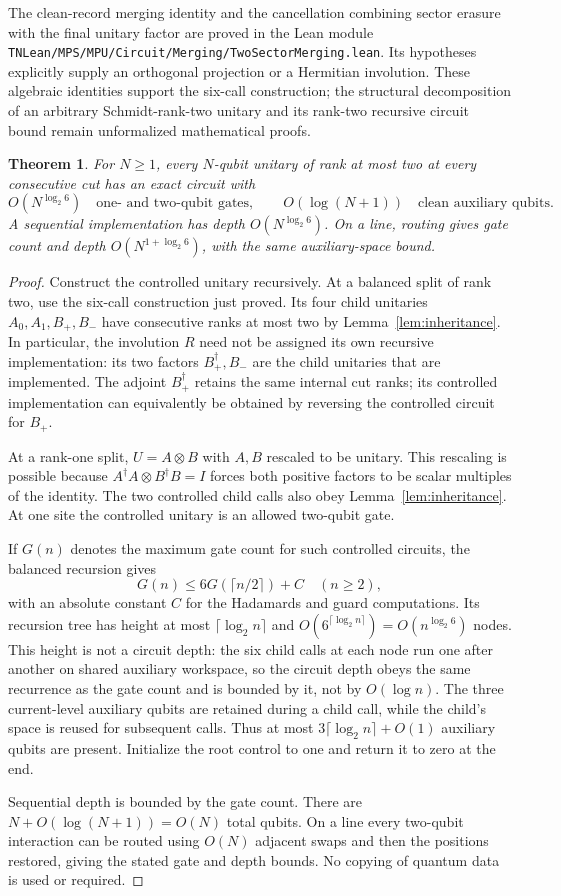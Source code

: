 \documentclass[11pt]{article}
\newtheorem{theorem}[lemma]{Theorem}
\begin{document}
The clean-record merging identity and the cancellation combining sector
erasure with the final unitary factor are proved in the Lean module
\nolinkurl{TNLean/MPS/MPU/Circuit/Merging/TwoSectorMerging.lean}. Its hypotheses
explicitly supply an orthogonal projection or a Hermitian involution.
These algebraic identities support the six-call construction; the
structural decomposition of an arbitrary Schmidt-rank-two unitary and
its rank-two recursive circuit bound remain unformalized mathematical proofs.

\begin{theorem}\label{thm:circuits}
For $N\geq1$, every $N$-qubit unitary of rank at most two at every consecutive cut
has an exact circuit with
\[
 O(N^{\log_2 6})\quad\text{one- and two-qubit gates},
 \qquad O(\log(N+1))\quad\text{clean auxiliary qubits}.
\]
A sequential implementation has depth $O(N^{\log_2 6})$.
On a line, routing gives gate count and depth
$O(N^{1+\log_2 6})$, with the same auxiliary-space bound.
\end{theorem}
\begin{proof}
Construct the controlled unitary recursively. At a balanced split of
rank two, use the six-call construction just proved. Its four child
unitaries $A_0,A_1,B_+,B_-$ have consecutive ranks at most two by
Lemma~\ref{lem:inheritance}. In particular, the involution $R$ need
not be assigned its own recursive implementation: its two factors
$B_+^\dagger,B_-$ are the child unitaries that are implemented.
The adjoint $B_+^\dagger$ retains the same internal cut ranks; its
controlled implementation can equivalently be obtained by reversing the
controlled circuit for $B_+$.

At a rank-one split, $U=A\otimes B$ with $A,B$ rescaled to be
unitary. This rescaling is possible because
$A^\dagger A\otimes B^\dagger B=I$ forces both positive factors to
be scalar multiples of the identity. The two controlled child calls
also obey Lemma~\ref{lem:inheritance}. At one site the controlled
unitary is an allowed two-qubit gate.

If $G(n)$ denotes the maximum gate count for such controlled circuits,
the balanced recursion gives
\[
 G(n)\leq6G(\lceil n/2\rceil)+C
 \quad(n\geq2),
\]
with an absolute constant $C$ for the Hadamards and guard computations.
Its recursion tree has height at most $\lceil\log_2 n\rceil$ and
$O(6^{\lceil\log_2 n\rceil})=O(n^{\log_2 6})$ nodes. This height is not
a circuit depth: the six child calls at each node run one after another
on shared auxiliary workspace, so the circuit depth obeys the same
recurrence as the gate count and is bounded by it, not by
$O(\log n)$.
The three current-level auxiliary qubits are retained during a child
call, while the child's space is reused for subsequent calls. Thus at
most $3\lceil\log_2 n\rceil+O(1)$ auxiliary qubits are present.
Initialize the root control to one and return it to zero at the end.

Sequential depth is bounded by the gate count. There are
$N+O(\log(N+1))=O(N)$ total qubits. On a line every two-qubit
interaction can be routed using $O(N)$ adjacent swaps and then the
positions restored, giving the stated gate and depth bounds. No copying
of quantum data is used or required.
\end{proof}
\end{document}

